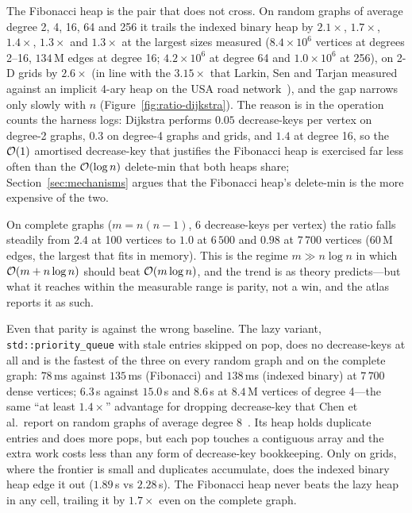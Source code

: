 The Fibonacci heap is the pair that does not cross. On random graphs of
average degree 2, 4, 16, 64 and 256 it trails the indexed binary heap by
$2.1\times$, $1.7\times$, $1.4\times$, $1.3\times$ and $1.3\times$ at the
largest sizes measured ($8.4\times10^6$ vertices at degrees 2--16, $134$\,M
edges at degree 16; $4.2\times10^6$ at degree 64 and $1.0\times10^6$ at 256), on 2-D grids by $2.6\times$ (in line with the $3.15\times$ that
Larkin, Sen and Tarjan measured against an implicit 4-ary heap on the USA road
network~\cite{larkin2014backtobasics}), and the gap narrows only slowly with
$n$ (Figure~\ref{fig:ratio-dijkstra}). The reason is in the operation counts
the harness logs: Dijkstra performs $0.05$ decrease-keys per vertex on
degree-2 graphs, $0.3$ on degree-4 graphs and grids, and $1.4$ at degree 16,
so the $\mathcal{O}(1)$ amortised decrease-key that justifies the Fibonacci heap is
exercised far less often than the $\mathcal{O}(\log n)$ delete-min that both heaps
share; Section~\ref{sec:mechanisms} argues that the Fibonacci heap's
delete-min is the more expensive of the two.

On complete graphs ($m = n(n-1)$, $6$ decrease-keys per vertex) the ratio
falls steadily from $2.4$ at 100 vertices to $1.0$ at $6\,500$ and $0.98$ at
$7\,700$ vertices ($60$\,M edges, the largest that fits in memory). This is
the regime $m \gg n\log n$ in which $\mathcal{O}(m+n\log n)$ should beat
$\mathcal{O}(m\log n)$, and the trend is as theory predicts---but what it reaches
within the measurable range is parity, not a win, and the atlas reports it as
such.

Even that parity is against the wrong baseline. The lazy variant,
\texttt{std::priority\_queue} with stale entries skipped on pop, does no
decrease-keys at all and is the fastest of the three on every random graph and
on the complete graph: $78$\,ms against $135$\,ms (Fibonacci) and $138$\,ms
(indexed binary) at $7\,700$ dense vertices; $6.3$\,s against $15.0$\,s and
$8.6$\,s at $8.4$\,M vertices of degree 4---the same ``at least $1.4\times$'' advantage for
dropping decrease-key that Chen et al.\ report on random graphs of average
degree 8~\cite{chen2007priority}. Its heap holds duplicate entries and does
more pops, but each pop touches a contiguous array and the extra work costs
less than any form of decrease-key bookkeeping. Only on grids, where the
frontier is small and duplicates accumulate, does the indexed binary heap edge
it out ($1.89$\,s vs $2.28$\,s). The Fibonacci heap never beats the lazy heap
in any cell, trailing it by $1.7\times$ even on the complete graph.

